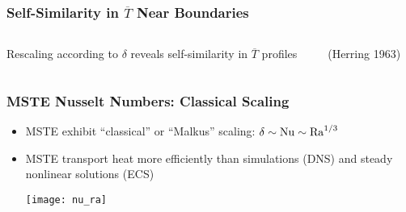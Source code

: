 \begin{frame}[fragile]
    \frametitle{Self-Similarity in $\overline{T}$ Near Boundaries}
    \begin{columns}[T]
        \begin{column}{0.5\textwidth}
            
            {Rescaling according to $\delta$ reveals self-similarity in $\overline{T}$ profiles}
        \end{column}
        \begin{column}{0.5\textwidth}
            \vfill
            \vfill
            \vfill
            
            {(Herring 1963)}
            \vfill
            \vfill
            \vfill
        \end{column}
    \end{columns}
\end{frame}

\begin{frame}[fragile]
    \frametitle{MSTE Nusselt Numbers: Classical Scaling}
    \begin{itemize}
        \item MSTE exhibit ``classical'' or ``Malkus'' scaling: $\delta \sim \rm{Nu} \sim \rm{Ra}^{1/3}$

        \item MSTE transport heat more efficiently than simulations (DNS) and steady nonlinear solutions (ECS)\newline
        

        \centering
        \texttt{[image: nu\_ra]}

    \end{itemize}
\end{frame}

